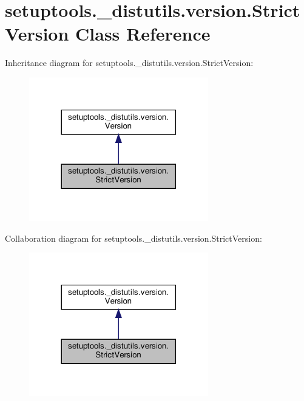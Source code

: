 \hypertarget{classsetuptools_1_1__distutils_1_1version_1_1StrictVersion}{}\section{setuptools.\+\_\+distutils.\+version.\+Strict\+Version Class Reference}
\label{classsetuptools_1_1__distutils_1_1version_1_1StrictVersion}


Inheritance diagram for setuptools.\+\_\+distutils.\+version.\+Strict\+Version\+:
\nopagebreak
\begin{figure}[H]
\begin{center}
\leavevmode
\includegraphics[width=221pt]{classsetuptools_1_1__distutils_1_1version_1_1StrictVersion__inherit__graph}
\end{center}
\end{figure}


Collaboration diagram for setuptools.\+\_\+distutils.\+version.\+Strict\+Version\+:
\nopagebreak
\begin{figure}[H]
\begin{center}
\leavevmode
\includegraphics[width=221pt]{classsetuptools_1_1__distutils_1_1version_1_1StrictVersion__coll__graph}
\end{center}
\end{figure}
